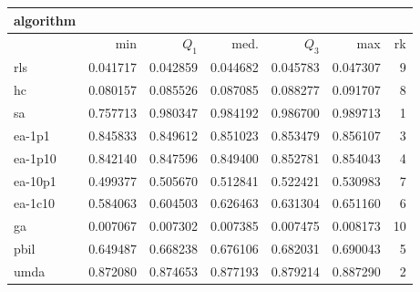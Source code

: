 \begin{tabular}{@{}l*{5}{>{{}}N{1}{3}}>{{}}N{2}{0}@{}}
\toprule
{algorithm} &  \\
\midrule
& {min} & {$Q_1$} & {med.} & {$Q_3$} & {max} & {rk}\\
\midrule
rls & 0.041717 & 0.042859 & 0.044682 & 0.045783 & 0.047307 & 9\\
hc & 0.080157 & 0.085526 & 0.087085 & 0.088277 & 0.091707 & 8\\
sa & 0.757713 & {\color{blue}} 0.980347 & {\color{blue}} 0.984192 & {\color{blue}} 0.986700 & {\color{blue}} 0.989713 & 1\\
ea-1p1 & 0.845833 & 0.849612 & 0.851023 & 0.853479 & 0.856107 & 3\\
ea-1p10 & 0.842140 & 0.847596 & 0.849400 & 0.852781 & 0.854043 & 4\\
ea-10p1 & 0.499377 & 0.505670 & 0.512841 & 0.522421 & 0.530983 & 7\\
ea-1c10 & 0.584063 & 0.604503 & 0.626463 & 0.631304 & 0.651160 & 6\\
ga & 0.007067 & 0.007302 & 0.007385 & 0.007475 & 0.008173 & 10\\
pbil & 0.649487 & 0.668238 & 0.676106 & 0.682031 & 0.690043 & 5\\
umda & {\color{blue}} 0.872080 & 0.874653 & 0.877193 & 0.879214 & 0.887290 & 2\\
\bottomrule
\end{tabular}
